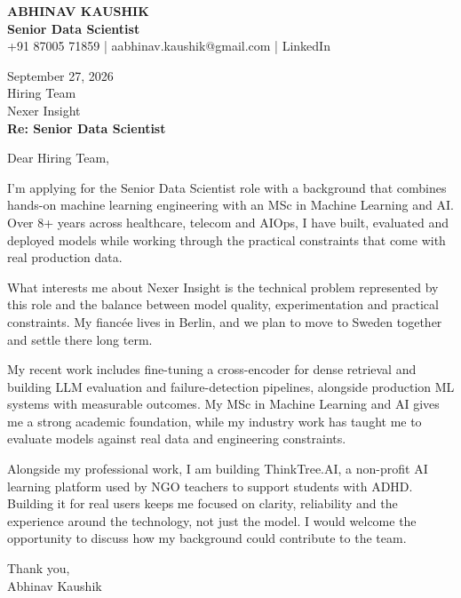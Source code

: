 \documentclass[10pt,a4paper]{article}
\begin{document}
\begin{center}
{\Large\bfseries ABHINAV KAUSHIK}\\[2pt]
{\bfseries Senior Data Scientist}\\[2pt]
+91 87005 71859 \quad | \quad aabhinav.kaushik@gmail.com \quad | \quad LinkedIn
\end{center}
\vspace{8pt}
September 27, 2026\\[6pt]
Hiring Team\\
Nexer Insight\\[4pt]
\textbf{Re: Senior Data Scientist}

Dear Hiring Team,

I’m applying for the Senior Data Scientist role with a background that combines hands-on machine learning engineering with an MSc in Machine Learning and AI. Over 8+ years across healthcare, telecom and AIOps, I have built, evaluated and deployed models while working through the practical constraints that come with real production data.

What interests me about Nexer Insight is the technical problem represented by this role and the balance between model quality, experimentation and practical constraints. My fiancée lives in Berlin, and we plan to move to Sweden together and settle there long term.

My recent work includes fine-tuning a cross-encoder for dense retrieval and building LLM evaluation and failure-detection pipelines, alongside production ML systems with measurable outcomes. My MSc in Machine Learning and AI gives me a strong academic foundation, while my industry work has taught me to evaluate models against real data and engineering constraints.

Alongside my professional work, I am building ThinkTree.AI, a non-profit AI learning platform used by NGO teachers to support students with ADHD. Building it for real users keeps me focused on clarity, reliability and the experience around the technology, not just the model. I would welcome the opportunity to discuss how my background could contribute to the team.

Thank you,\\
Abhinav Kaushik
\end{document}
